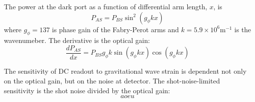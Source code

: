 The power at the dark port as a function of differential arm length,
$x$, is
\begin{equation}
P_{AS} = P_{BS} \sin^2{(g_{\phi}kx)}
\end{equation}
where $g_{\phi} = 137$ is phase gain of the Fabry-Perot arms and
$k=5.9\times10^6 \mathrm{m}^{-1}$ is the wavenumeber. The derivative
is the optical gain:
\begin{equation}
\frac{dP_{AS}}{dx} = P_{BS} g_{\phi} k \sin{(g_{\phi}kx)} \cos{(g_{\phi}kx)}
\end{equation}

The sensitivity of DC readout to gravitational wave strain is
dependent not only on the optical gain, but on the noise at
detector. The shot-noise-limited sensitivity is the shot noise divided
by the optical gain:
\begin{equation}
aoeu
\end{equation}

